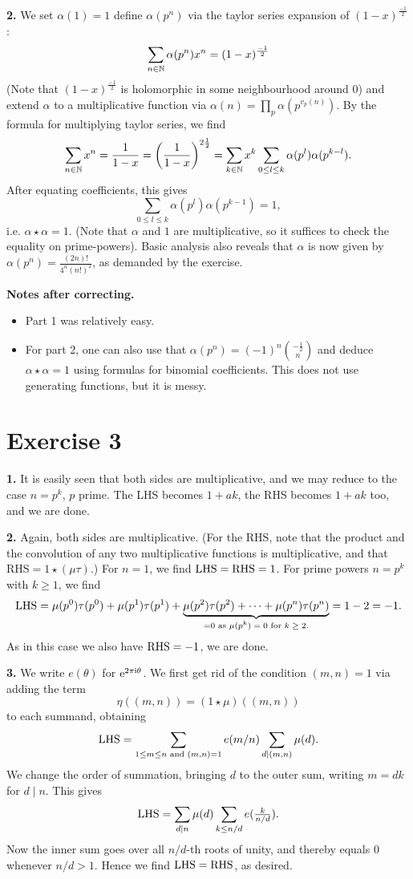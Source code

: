 \documentclass[a4paper,11pt]{article}
\begin{document}
\textbf{2.} 
We set $\alpha(1) = 1$ define $\alpha(p^n)$ via the taylor series expansion of
$(1-x)^{\frac{-1}2}$:
\[
    \sum_{n \in \mathbb{N}} \alpha(p^n) x^n = (1-x)^{\frac{-1}2}
\]
(Note that $(1-x)^{\frac{-1}2}$ is holomorphic in some neighbourhood around $0$) 
and extend $\alpha$ to a multiplicative function via $\alpha(n) = \prod_{p}
\alpha(p^{v_p(n)})$. By the formula for multiplying taylor series, we find 
\[
    \sum_{n \in \mathbb{N}} x^n = \frac{1}{1-x} = \left( \frac{1}{1-x} \right)^{2 \frac 12}
    = \sum_{k \in \mathbb{N}}x^k \sum_{0 \leq l \leq k} \alpha(p^l) \alpha(p^{k-l}).
\]
After equating coefficients, this gives
\[
    \sum_{0 \leq l \leq k} \alpha(p^l) \alpha(p^{k-1}) = 1,
\]
i.e. $\alpha \star \alpha = 1$. (Note that $\alpha$ and $1$ are multiplicative, so it suffices
to check the equality on prime-powers). 
Basic analysis also reveals that $\alpha$ is now given by $\alpha(p^n) =
\frac{(2n)!}{4^n(n!)^2}$, as demanded by the exercise.

\textbf{Notes after correcting.} \leavevmode
\begin{itemize}
    \item Part 1 was relatively easy.
    \item For part 2, one can also use that $\alpha(p^n) = (-1)^n\binom{-\frac 12}{n}$ and
        deduce $\alpha \star \alpha = 1$ using formulas for binomial
        coefficients. This does not use generating functions, but it is messy. 
\end{itemize}

\section*{Exercise 3}
\textbf{1.} It is easily seen that both sides are multiplicative, and we may reduce to 
the case $n = p^k$, $p$ prime. The LHS becomes $1+ak$, the RHS becomes $1+ak$
too, and we are done.

\textbf{2.} Again, both sides are multiplicative. (For the RHS, note that the product and the
convolution of any two multiplicative functions is multiplicative, and that 
$\text{RHS} = 1 \star (\mu \tau)$.) For $n = 1$, we find $\mathrm{LHS} = \mathrm{RHS} = 1$. For
prime powers $n = p^k$ with $k \geq 1$, we find 
\[
    \mathrm{LHS} = \mu(p^0) \tau(p^0) + \mu(p^1) \tau(p^1) + \underbrace{ \mu(p^2) \tau(p^2) + \dots 
+ \mu(p^n) \tau(p^n) }_{= 0 \text{ as $\mu(p^k) = 0$ for $k \geq 2$.}} = 1 - 2 = -1.
\]
As in this case we also have $\mathrm{RHS} = -1$, we are done. 

\textbf{3.} We write $e(\theta)$ for $\mathrm e^{2 \pi \mathrm i \theta}$. We first get rid of
the condition $(m,n) = 1$ via adding the term 
\[
    \eta((m,n)) = (1 \star \mu)((m,n))
\]
to each summand, obtaining
\[
    \mathrm{LHS} = \sum_{1 \leq m \leq n \text{ and } (m,n) = 1} e(m/n) \sum_{d \mid (m,n)} \mu(d).
\]
We change the order of summation, bringing $d$ to the outer sum, writing $m =
dk$ for $d \mid n$. This gives
\[
    \mathrm{LHS} = \sum_{d \mid n} \mu(d) \sum_{k \leq n/d} e(\tfrac{k}{n/d}).
\]
Now the inner sum goes over all $n/d$-th roots of unity, and thereby equals $0$ whenever 
$n/d > 1$. Hence we find 
$\mathrm{LHS} = \mathrm{RHS}$, as desired. 
\end{document}
